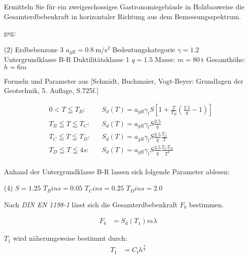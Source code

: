 
Ermitteln Sie für ein zweigeschossiges Gastronomiegebäude in Holzbauweise die Gesamterdbebenkraft in horizontaler Richtung
aus dem Bemessungsspektrum.

\begin{minipage}[t]{\linewidth}
    geg:
    \begin{tasks} (2)
        \task[] Erdbebenzone 3
        \task[] $a_{gR} = \SI{0.8}{\metre\per\second^2}$
        \task[] Bedeutungskategorie 
        \task[] $\gamma = 1.2$
        \task[] Untergrundklasse B-R
        \task[]
        \task[] Duktilitätsklasse 1
        \task[] $q = 1.5$
        \task[] Masse: $m =\SI{80}{\tonne}$
        \task[] Gesamthöhe: $h = 6m$
    \end{tasks}
\end{minipage}

Formeln und Parameter aus [Schmidt, Buchmaier, Vogt-Beyer: Grundlagen der Geotechnik, 5. Auflage, S.725f.]

\begin{align*}
    &0 < T \leqq T_B: &&S_d(T) = a_{gR} \gamma_l S [1 + \frac{T}{T_B}(\frac{2.5}{q} -1)] \\
    &T_B \leqq T \leqq T_C: &&S_d(T) = a_{gR} \gamma_l S \frac{2.5}{q} \\
    &T_C \leqq T \leqq T_D: &&S_d(T) = a_{gR} \gamma_l S \frac{2.5}{q} \frac{T_C}{T} \\
    &T_D \leqq T \leqq 4s: &&S_d(T) = a_{gR} \gamma_l S \frac{2.5}{q} \frac{T_C T_D}{T^2} \\
\end{align*}

Anhand der Untergrundklasse B-R lassen sich folgende Parameter ablesen:
\begin{tasks} (4)
    \task[] $S = 1.25$
    \task[] $T_B in s = 0.05$
    \task[] $T_C in s = 0.25$
    \task[] $T_D in s = 2.0$
\end{tasks}

Nach \textit{DIN EN 1198-1} lässt sich die Gesamterdbebenkraft $F_b$ bestimmen.

\begin{align*}
    F_b &= S_d(T_1) m \lambda
\end{align*}

$T_1$ wird näherungsweise bestimmt durch:
\begin{align*}
    T_1 &= C_t h^{\frac{3}{4}}
\end{align*}

